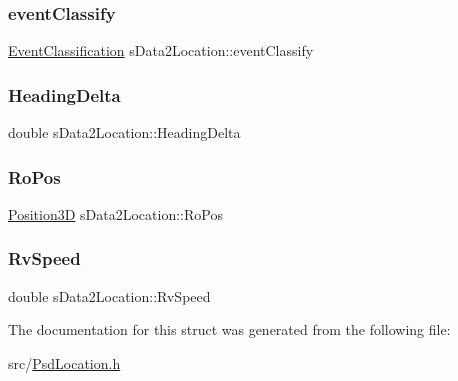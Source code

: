 \subsubsection{\texorpdfstring{event\+Classify}{eventClassify}}
{\footnotesize\ttfamily \hyperlink{_psd_location_8h_a6f150184d2a8f67d5c7de45bac365d15}{Event\+Classification} s\+Data2\+Location\+::event\+Classify}

\mbox{\label{structs_data2_location_ae46f8fccbf91e76dc5c389bbf08ab927}} 
\subsubsection{\texorpdfstring{Heading\+Delta}{HeadingDelta}}
{\footnotesize\ttfamily double s\+Data2\+Location\+::\+Heading\+Delta}

\mbox{\label{structs_data2_location_abcac106c1692d71348a9184a194a9e02}} 
\subsubsection{\texorpdfstring{Ro\+Pos}{RoPos}}
{\footnotesize\ttfamily \hyperlink{_geometric_calc_8h_aabfa1dd0400b274a48b4a45afbee0af4}{Position3D} s\+Data2\+Location\+::\+Ro\+Pos}

\mbox{\label{structs_data2_location_a989f56d96048891777a1ffdfec13fdab}} 
\subsubsection{\texorpdfstring{Rv\+Speed}{RvSpeed}}
{\footnotesize\ttfamily double s\+Data2\+Location\+::\+Rv\+Speed}



The documentation for this struct was generated from the following file\+:\begin{DoxyCompactItemize}
\item 
src/\hyperlink{_psd_location_8h}{Psd\+Location.\+h}\end{DoxyCompactItemize}

